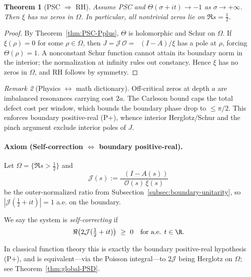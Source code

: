 \documentclass[11pt]{article}
\newtheorem{theorem}{Theorem}
\theoremstyle{remark}
\newtheorem{remark}[theorem]{Remark}
\DeclareMathOperator{\dettwo}{det_2}
\begin{document}
\begin{theorem}[PSC \(\Rightarrow\) RH]\label{thm:PSC-RH}
Assume PSC and \(\Theta(\sigma+it)\to -1\) as \(\sigma\to+\infty\). Then \(\xi\) has no zeros in \(\Omega\). In particular, all nontrivial zeros lie on \(\Re s=\tfrac12\).
\end{theorem}
\begin{proof}
By Theorem~\ref{thm:PSC-Pplus}, \(\Theta\) is holomorphic and Schur on \(\Omega\).
If \(\xi(\rho)=0\) for some \(\rho\in\Omega\), then \(J=\mathcal J\,\mathcal O=\dettwo(I-A)/\xi\) has a pole at \(\rho\), forcing \(\Theta(\rho)=1\). A nonconstant Schur function cannot attain its boundary norm in the interior; the normalization at infinity rules out constancy. Hence \(\xi\) has no zeros in \(\Omega\), and RH follows by symmetry.
\end{proof}

\begin{remark}[Physics $\leftrightarrow$ math dictionary]
Off-critical zeros at depth \(a\) are imbalanced resonances carrying cost \(2a\). The Carleson bound caps the total defect cost per window, which bounds the boundary phase drop to \(\le\pi/2\). This enforces boundary positive-real (P+), whence interior Herglotz/Schur and the pinch argument exclude interior poles of \(J\).
\end{remark}

\paragraph{Axiom (Self-correction $\Leftrightarrow$ boundary positive-real).}
Let \(\Omega=\{\Re s>\tfrac12\}\) and
\[\mathcal J(s):=\frac{\dettwo(I-A(s))}{\mathcal O(s)\,\xi(s)}\]
be the outer-normalized ratio from Subsection~\ref{subsec:boundary-unitarity}, so $|\mathcal J(\tfrac12+it)|=1$ a.e. on the boundary. 
\begin{definition}\label{def:SC}
We say the system is \emph{self-correcting} if
\[\Re\bigl(2\mathcal J(\tfrac12+it)\bigr)\ \ge\ 0\quad\text{for a.e. }t\in\R.\]
\end{definition}
In classical function theory this is exactly the boundary positive-real hypothesis (P+), and is equivalent—via the Poisson integral—to $2\mathcal J$ being Herglotz on $\Omega$; see Theorem~\ref{thm:global-PSD}.
\end{document}
